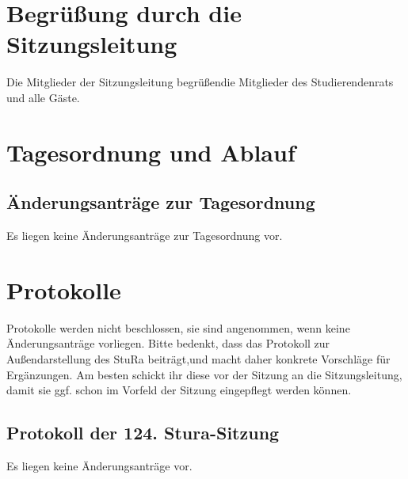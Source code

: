 \section{Begrüßung durch die Sitzungsleitung}
Die Mitglieder  der  Sitzungsleitung begrüßendie  Mitglieder  des  Studierendenrats  und  alle Gäste.

\section{Tagesordnung und Ablauf}
\hypersetup{linkcolor=black}%
\tableofcontents
\hypersetup{linkcolor=blue}%
\subsection{Änderungsanträge zur Tagesordnung}
Es liegen keine Änderungsanträge zur Tagesordnung vor.

\section{Protokolle}
Protokolle werden nicht beschlossen, sie sind angenommen, wenn keine Änderungsanträge vorliegen.
Bitte bedenkt, dass das Protokoll zur Außendarstellung des StuRa beiträgt,und macht daher konkrete Vorschläge
für Ergänzungen. Am besten schickt ihr diese vor der Sitzung an die Sitzungsleitung, damit sie ggf. schon im 
Vorfeld der Sitzung eingepflegt werden können.
\subsection{Protokoll der 124. Stura-Sitzung}
Es liegen keine Änderungsanträge vor.